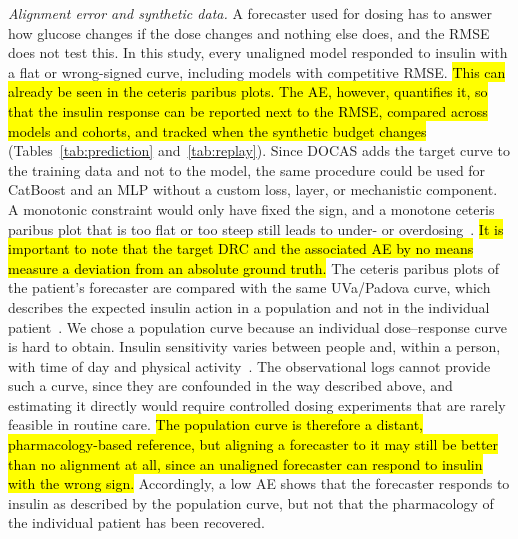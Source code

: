 \documentclass[a4paper,fleqn]{cas-sc}
\begin{document}
\textit{Alignment error and synthetic data.}
A forecaster used for dosing has to answer how glucose changes if the dose changes and nothing else does, and the RMSE does not test this. In this study, every unaligned model responded to insulin with a flat or wrong-signed curve, including models with competitive RMSE. \hl{This can already be seen in the ceteris paribus plots. The AE, however, quantifies it, so that the insulin response can be reported next to the RMSE, compared across models and cohorts, and tracked when the synthetic budget changes} (Tables~\ref{tab:prediction} and~\ref{tab:replay}). Since DOCAS adds the target curve to the training data and not to the model, the same procedure could be used for CatBoost and an MLP without a custom loss, layer, or mechanistic component. A monotonic constraint would only have fixed the sign, and a monotone ceteris paribus plot that is too flat or too steep still leads to under- or overdosing~\citep{wolber2025,kushner2020,runje2023}. \hl{It is important to note that the target DRC and the associated AE by no means measure a deviation from an absolute ground truth.} The ceteris paribus plots of the patient's forecaster are compared with the same UVa/Padova curve, which describes the expected insulin action in a population and not in the individual patient~\citep{dallaman2007,cobelli2009}. We chose a population curve because an individual dose--response curve is hard to obtain. Insulin sensitivity varies between people and, within a person, with time of day and physical activity~\citep{hinshaw2013,visentin2015,riddell2017}. The observational logs cannot provide such a curve, since they are confounded in the way described above, and estimating it directly would require controlled dosing experiments that are rarely feasible in routine care. \hl{The population curve is therefore a distant, pharmacology-based reference, but aligning a forecaster to it may still be better than no alignment at all, since an unaligned forecaster can respond to insulin with the wrong sign.} Accordingly, a low AE shows that the forecaster responds to insulin as described by the population curve, but not that the pharmacology of the individual patient has been recovered.
\end{document}
